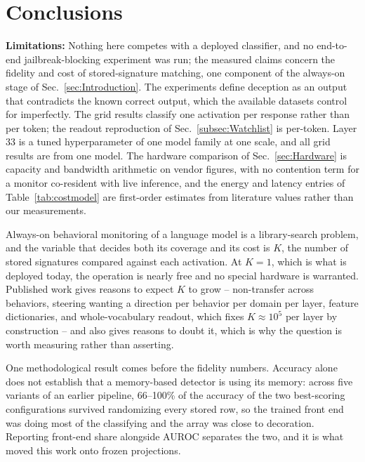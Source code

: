 \documentclass[conference]{IEEEtran}
\newcommand{\auroc}{{AUROC}\xspace}
\begin{document}

\section{Conclusions}
\label{sec:Conclusions}
\label{subsec:Limitations}
\label{subsec:Conclusions}
\textbf{Limitations:} Nothing here competes with a deployed
classifier, and no end-to-end jailbreak-blocking experiment was run;
the measured claims concern the fidelity and cost of stored-signature
matching, one component of the always-on stage of
Sec.~\ref{sec:Introduction}. The experiments define deception as an
output that contradicts the known correct output, which the available
datasets control for imperfectly. The grid results classify one
activation per response rather than per token; the readout
reproduction of Sec.~\ref{subsec:Watchlist} is per-token. Layer 33 is
a tuned hyperparameter of one model family at one scale, and all grid
results are from one model. The hardware comparison of
Sec.~\ref{sec:Hardware} is capacity and bandwidth arithmetic on vendor
figures, with no contention term for a monitor co-resident with live
inference, and the energy and latency entries of
Table~\ref{tab:costmodel} are first-order estimates from literature
values rather than our measurements.

Always-on behavioral monitoring of a language model is a library-search
problem, and the variable that decides both its coverage and its cost is
$K$, the number of stored signatures compared against each activation. At
$K=1$, which is what is deployed today, the operation is nearly free and
no special hardware is warranted. Published work gives reasons to expect
$K$ to grow -- non-transfer across behaviors, steering wanting a
direction per behavior per domain per layer, feature dictionaries, and
whole-vocabulary readout, which fixes $K\!\approx\!10^{5}$ per layer by
construction -- and also gives reasons to doubt it, which is why the
question is worth measuring rather than asserting.

One methodological result comes before the fidelity numbers. Accuracy
alone does not establish that a memory-based detector is using its
memory: across five variants of an earlier pipeline, 66--100\% of the
accuracy of the two best-scoring configurations survived randomizing
every stored row, so the trained front end was doing most of the
classifying and the array was close to decoration. Reporting front-end
share alongside \auroc separates the two, and it is what moved this work
onto frozen projections.
\end{document}
